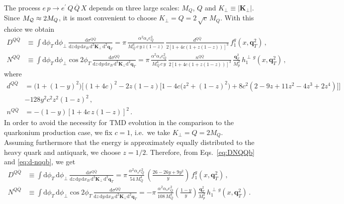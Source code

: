 \documentclass[prd,aps,preprintnumbers,nofootinbib,superscriptaddress]{revtex4}
\newcommand{\xB}{x_{\scriptscriptstyle B}}
\newcommand{\sT}{{\scriptscriptstyle T}}
\renewcommand{\d}{\mathrm{d}}
\begin{document}
The process $e\, p \to e^\prime \,Q \,\overline{Q}\, X$ depends on three large scales: $M_Q$, $Q$ and $K_\perp \equiv \vert \bm K_\perp \vert$. 
Since $M_{{\cal Q}} \approx 2M_Q$, it is most convenient to choose $K_\perp = Q=2\, \sqrt{c}\,  M_Q$. With this choice we obtain
\begin{align}
D^{Q \overline Q} & \equiv  \int \d \phi_\sT \, \d \phi_\perp\,\frac{\d\sigma^{Q \overline Q}}{\d z \,\d y\,\d\xB\,\d^2 \bm{K}_{\perp} \,\d^2 \bm{q}_{\sT} }  = \pi \, \frac{\alpha^2 \alpha_s e^2_Q}{M_Q^4 \,c\,y\,z(1-z)} \, \frac{d^{Q\overline{Q}}}{2 [1+ 4 c(1+  z(1-z)) ]^3} \,f_1^g(x, \bm q_\sT^2)\,, \nonumber \\
N^{Q \overline Q} & \equiv
\int \d \phi_\sT\, \d \phi_\perp\cos 2\phi_\sT\,\frac{\d\sigma^{Q \overline Q}}{\d z\, \d y\,\d\xB\,\d^2 \bm{K}_{\perp}\d^2 \bm{q}_{\sT} }=   \pi \, \frac{\alpha^2 \alpha_s e^2_Q}{M_Q^4\,c\,y}  \, \frac{n^{Q\overline{Q}} }{2 [1+4c(1+ z(1-z))]^3} \,  \frac{\bm q_\sT^2}{ M_p^2}\,h_1^{\perp\, g}(x, \bm q_\sT^2)\,,
\label{eq:DNQQb}
\end{align}
where
\begin{align}
d^{Q\overline{Q}} & = \big(1+(1-y)^2\big) \Big[(1+4c)^2-2z(1-z)\big[1-4c\big(z^2+(1-z)^2\big)+8c^2 (2-9z+11z^2-4z^3+2z^4)\big]\Big]\\
&-128y^2c^2 z^2(1-z)^2\,, \nonumber\\
n^{Q\overline{Q}} & = - ( 1-y )[1+4 c\,z(1-z)]^2 \,.
\label{eq:d-nqqb}
\end{align}
In order to avoid the necessity for TMD evolution in the comparison to the quarkonium production case, we fix $c=1$, i.e.\ we take $K_\perp=Q= 2 M_Q$. Assuming furthermore that the energy is approximately equally distributed to the heavy quark and antiquark, we choose $z = 1/2$. Therefore, from Eqs.~\eqref{eq:DNQQb} and \eqref{eq:d-nqqb}, we get~\cite{Boer:2016fqd} 
\begin{align}
D^{Q \overline Q} & \equiv  \int \d \phi_\sT \, \d \phi_\perp\,\frac{\d\sigma^{Q \overline Q}}{\d z \,\d y\,\d\xB\,\d^2 \bm{K}_{\perp} \,\d^2 \bm{q}_{\sT} }  = \pi \, \frac{\alpha^2 \alpha_s e^2_Q}{54 \, M_Q^4} \,\left (  \frac{26 -26 y + 9y^2}{y} \right ) \,f_1^g(x, \bm q_\sT^2)\,,\\
N^{Q \overline Q} & \equiv
\int \d \phi_\sT\, \d \phi_\perp\cos 2\phi_\sT\,\frac{\d\sigma^{Q \overline Q}}{\d z\, \d y\,\d\xB\,\d^2 \bm{K}_{\perp}\d^2 \bm{q}_{\sT} }=   - \pi \, \frac{\alpha^2 \alpha_s e^2_Q}{108 \, M_Q^4}  \left ( \frac{1-y }{y} \right )  \frac{\bm q_\sT^2}{ M_p^2}\,h_1^{\perp\, g}(x, \bm q_\sT^2)\,. 
\end{align}
\end{document}
